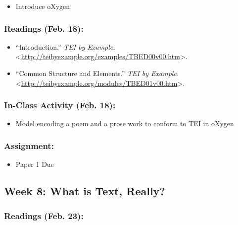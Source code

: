 \documentclass[]{article}
\begin{document}
\begin{itemize}
\itemsep1pt\parskip0pt
\item
  Introduce oXygen
\end{itemize}

\subsubsection{Readings (Feb. 18):}\label{readings-feb.-18}

\begin{itemize}
\itemsep1pt\parskip0pt
\item
  ``Introduction.'' \emph{TEI by Example.}
  \textless{}\url{http://teibyexample.org/examples/TBED00v00.htm}\textgreater{}.
\item
  ``Common Structure and Elements.'' \emph{TEI by Example.}
  \textless{}\url{http://teibyexample.org/modules/TBED01v00.htm}\textgreater{}.
\end{itemize}

\subsubsection{In-Class Activity (Feb.
18):}\label{in-class-activity-feb.-18}

\begin{itemize}
\itemsep1pt\parskip0pt
\item
  Model encoding a poem and a prose work to conform to TEI in oXygen
\end{itemize}

\subsubsection{Assignment:}\label{assignment}

\begin{itemize}
\itemsep1pt\parskip0pt
\item
  Paper 1 Due
\end{itemize}

\subsection{Week 8: What is Text,
Really?}\label{week-8-what-is-text-really}

\subsubsection{Readings (Feb. 23):}\label{readings-feb.-23}
\end{document}
